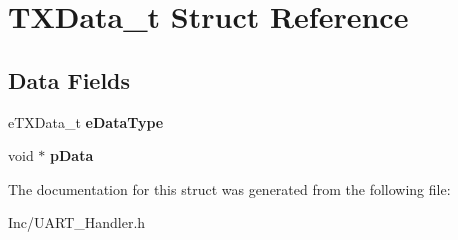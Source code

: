 \hypertarget{struct_t_x_data__t}{}\section{T\+X\+Data\+\_\+t Struct Reference}
\label{struct_t_x_data__t}
\subsection*{Data Fields}
\begin{DoxyCompactItemize}
\item 
\mbox{\label{struct_t_x_data__t_a8cd9aa6c8b7e217e88052cad45c1e206}} 
e\+T\+X\+Data\+\_\+t {\bfseries e\+Data\+Type}
\item 
\mbox{\label{struct_t_x_data__t_aa92f08987c51e4eb7b92e84944ca2af3}} 
void $\ast$ {\bfseries p\+Data}
\end{DoxyCompactItemize}


The documentation for this struct was generated from the following file\+:\begin{DoxyCompactItemize}
\item 
Inc/U\+A\+R\+T\+\_\+\+Handler.\+h\end{DoxyCompactItemize}
